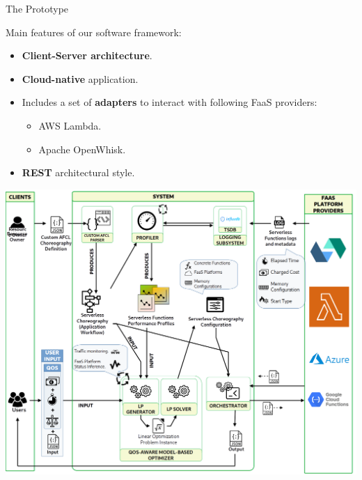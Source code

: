 \documentclass[13.5pt]{beamer}
\newcommand{\B}[1]{\textcolor{TorVergataColor}{\textbf{#1}}}
\begin{document}
\begin{frame}{The Prototype}
	
 	Main features of our software framework:
	\vspace{\baselineskip}
	\begin{itemize}
		\item \B{Client-Server architecture}.
		\item \B{Cloud-native} application.
		\item Includes a set of \B{adapters} to interact with following FaaS providers:
		\begin{itemize}
			\item AWS Lambda.
			\item Apache OpenWhisk.
		\end{itemize}
		\item \B{REST} architectural style.
	\end{itemize}
	
\end{frame} 
\begin{frame}

\begin{center}
	\includegraphics[width=\textwidth,height=0.95\textheight]{../Images/SystemForSlide.png}
\end{center}


\end{frame} 
\end{document}
